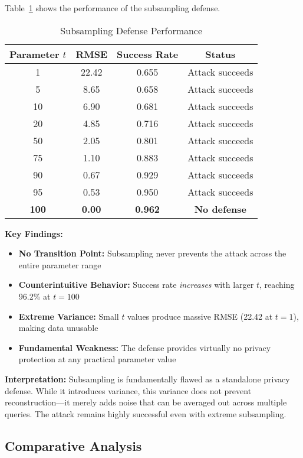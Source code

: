 \documentclass[11pt,letterpaper]{article}
\begin{document}
Table~\ref{tab:subsampling} shows the performance of the subsampling defense.

\begin{table}[H]
\centering
\caption{Subsampling Defense Performance}
\label{tab:subsampling}
\begin{tabular}{@{}cccc@{}}
\toprule
\textbf{Parameter $t$} & \textbf{RMSE} & \textbf{Success Rate} & \textbf{Status} \\ \midrule
1 & 22.42 & 0.655 & Attack succeeds \\
5 & 8.65 & 0.658 & Attack succeeds \\
10 & 6.90 & 0.681 & Attack succeeds \\
20 & 4.85 & 0.716 & Attack succeeds \\
50 & 2.05 & 0.801 & Attack succeeds \\
75 & 1.10 & 0.883 & Attack succeeds \\
90 & 0.67 & 0.929 & Attack succeeds \\
95 & 0.53 & 0.950 & Attack succeeds \\
\textbf{100} & \textbf{0.00} & \textbf{0.962} & \textbf{No defense} \\ \bottomrule
\end{tabular}
\end{table}

\textbf{Key Findings:}

\begin{itemize}[leftmargin=*]
    \item \textbf{No Transition Point:} Subsampling never prevents the attack across the entire parameter range
    \item \textbf{Counterintuitive Behavior:} Success rate \textit{increases} with larger $t$, reaching 96.2\% at $t=100$
    \item \textbf{Extreme Variance:} Small $t$ values produce massive RMSE (22.42 at $t=1$), making data unusable
    \item \textbf{Fundamental Weakness:} The defense provides virtually no privacy protection at any practical parameter value
\end{itemize}

\textbf{Interpretation:} Subsampling is fundamentally flawed as a standalone privacy defense. While it introduces variance, this variance does not prevent reconstruction---it merely adds noise that can be averaged out across multiple queries. The attack remains highly successful even with extreme subsampling.

\subsection{Comparative Analysis}
\end{document}
